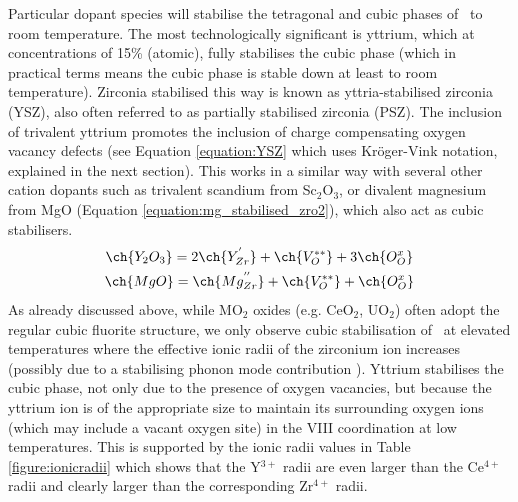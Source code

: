 Particular dopant species will stabilise the tetragonal and cubic phases of \zirconia\ to room temperature. The most technologically significant is yttrium, which at concentrations of 15\% (atomic), fully stabilises the cubic phase (which in practical terms means the cubic phase is stable down at least to room temperature). Zirconia stabilised this way is known as yttria-stabilised zirconia (YSZ), also often referred to as partially stabilised zirconia (PSZ). The inclusion of trivalent yttrium promotes the inclusion of charge compensating oxygen vacancy defects (see Equation \ref{equation:YSZ} which uses Kr\"{o}ger-Vink notation, explained in the next section). This works in a similar way with several other cation dopants such as trivalent scandium from Sc$_{2}$O$_{3}$, or divalent magnesium from MgO (Equation \ref{equation:mg_stabilised_zro2}), which also act as cubic stabilisers.
\begin{gather}
\ch{Y_{2}O_{3}} = 2\ch{Y_{Zr}^{'}} + \ch{V_{O}^{**}} + 3\ch{O_{O}^{x}} \label{equation:YSZ} \\
\ch{MgO} = \ch{Mg_{Zr}^{''}} + \ch{V_{O}^{**}} + \ch{O_{O}^{x}} 
\label{equation:mg_stabilised_zro2}
\end{gather}
As already discussed above, while MO$_{2}$ oxides (e.g. CeO$_{2}$, UO$_{2}$) often adopt the regular cubic fluorite structure, we only observe cubic stabilisation  of \zirconia\ at elevated temperatures where the effective ionic radii of the zirconium ion increases (possibly due to a stabilising phonon mode contribution \cite{Mirgorodsky1999, Perry1990, Simeone2003, Harlow2018}). Yttrium stabilises the cubic phase, not only due to the presence of oxygen vacancies, but because the yttrium ion is of the appropriate size to maintain its surrounding oxygen ions (which may include a vacant oxygen site) in the VIII coordination at low temperatures. This is supported by the ionic radii values in Table \ref{figure:ionicradii} which shows that the Y$^{3+}$ radii are even larger than the Ce$^{4+}$ radii and clearly larger than the corresponding Zr$^{4+}$ radii. 


